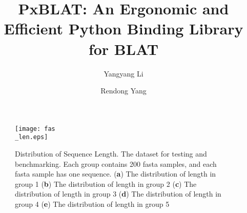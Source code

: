 \documentclass[unnumsec,webpdf,contemporary,large,namedate]{oup-authoring-template-supp}%
\theoremstyle{thmstyleone}%
\theoremstyle{thmstyletwo}%
\theoremstyle{thmstylethree}%
\begin{document}




\title[Ergonomic Genomic Analysis with \gls{pxblat}]{PxBLAT: An Ergonomic and Efficient Python Binding Library for BLAT}

\author[1]{Yangyang Li}
\author[1,2,$\ast$]{Rendong Yang}


\address[1]{, , }
\address[2]{, , }



\abstract{}

\makeatletter
\renewcommand{\thefigure}{S\@arabic\c@figure} %
\renewcommand{\thetable}{S\@arabic\c@table} %
\makeatother
\def\theequation{S\arabic{equation}}

\maketitle

\newpage
\begin{figure}[!ht]
	\centering
	\texttt{[image: fas\\\_len.eps]}
	\caption{Distribution of Sequence Length. The dataset for testing and benchmarking. Each group contains \num{200} fasta samples, and each fasta sample has one sequence.
		(\textbf{a}) The distribution of length in group \num[round-mode=places, round-precision=0]{1}
		(\textbf{b}) The distribution of length in group \num[round-mode=places, round-precision=0]{2}
		(\textbf{c}) The distribution of length in group \num[round-mode=places, round-precision=0]{3}
		(\textbf{d}) The distribution of length in group \num[round-mode=places, round-precision=0]{4}
		(\textbf{e}) The distribution of length in group \num[round-mode=places, round-precision=0]{5}
	}
	\label{suppfig:fas-len}
\end{figure}







% 
% 
\end{document}
